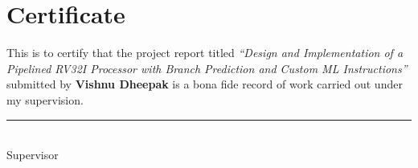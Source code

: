 \chapter*{Certificate}

\thispagestyle{empty}

\vspace*{2cm}
This is to certify that the project report titled
\textit{``Design and Implementation of a Pipelined RV32I Processor with
Branch Prediction and Custom ML Instructions''}
submitted by \textbf{Vishnu Dheepak} is a bona fide record of work carried
out under my supervision.

\vspace{3cm}
\noindent\rule{6cm}{0.4pt}\\
Supervisor

\clearpage
